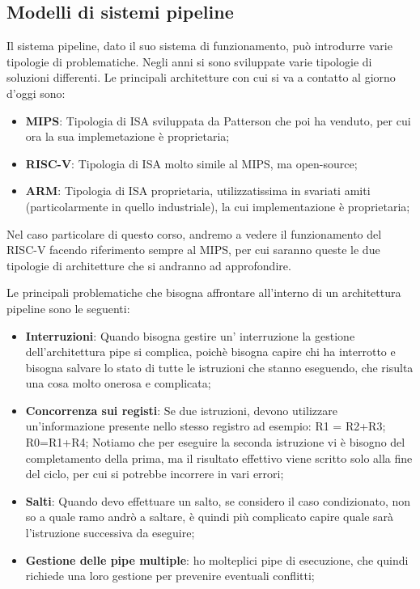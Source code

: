 \subsection{Modelli di sistemi pipeline}
Il sistema pipeline, dato il suo sistema di funzionamento, può introdurre varie tipologie di problematiche. Negli anni si sono sviluppate varie tipologie di soluzioni differenti.
Le principali architetture con cui si va a contatto al giorno d'oggi sono:
\begin{itemize}
    \item \textbf{MIPS}: Tipologia di ISA sviluppata da Patterson che poi ha venduto, per cui ora la sua implemetazione è proprietaria;
    \item \textbf{RISC-V}: Tipologia di ISA molto simile al MIPS, ma open-source;
    \item \textbf{ARM}: Tipologia di ISA proprietaria, utilizzatissima in svariati amiti (particolarmente in quello industriale), la cui implementazione è proprietaria;
\end{itemize}

Nel caso particolare di questo corso, andremo a vedere il funzionamento del RISC-V facendo riferimento sempre al MIPS, per cui saranno queste le due tipologie di architetture che si andranno ad approfondire.

Le principali problematiche che bisogna affrontare all'interno di un architettura pipeline sono le seguenti:
\begin{itemize}
    \item \textbf{Interruzioni}: Quando bisogna gestire un' interruzione la gestione dell'architettura pipe si complica, poichè bisogna capire chi ha interrotto e bisogna salvare lo stato di tutte le istruzioni che stanno eseguendo, che risulta una cosa molto onerosa e complicata;
    \item \textbf{Concorrenza sui registi}: Se due istruzioni, devono utilizzare un'informazione presente nello stesso registro ad esempio: R1 = R2+R3; R0=R1+R4;  Notiamo che per eseguire la seconda istruzione vi è bisogno del completamento della prima, ma il risultato effettivo viene scritto solo alla fine del ciclo, per cui si potrebbe incorrere in vari errori;
    \item \textbf{Salti}: Quando devo effettuare un salto, se considero il caso condizionato, non so a quale ramo andrò a saltare, è quindi più complicato capire quale sarà l'istruzione successiva da eseguire;
    \item \textbf{Gestione delle pipe multiple}: ho molteplici pipe di esecuzione, che quindi richiede una loro gestione per prevenire eventuali conflitti;
\end{itemize}

